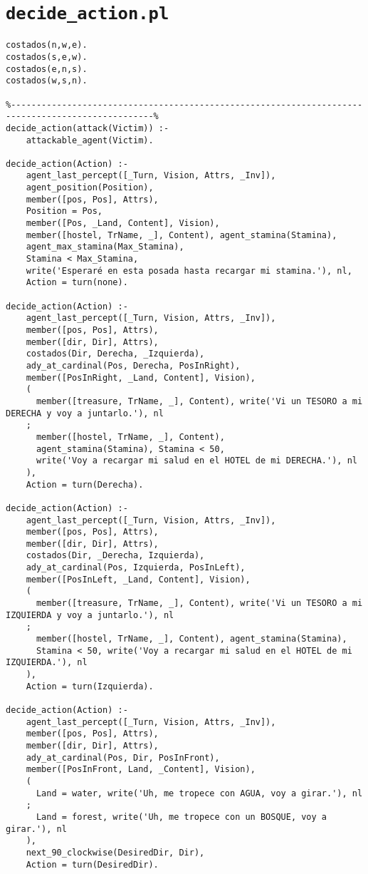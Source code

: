 \documentclass[a4paper,12pt]{report}
\begin{document}
\section{\texttt{decide\_action.pl}}

\begin{scriptsize}
\begin{verbatim}
costados(n,w,e).
costados(s,e,w).
costados(e,n,s).
costados(w,s,n).

%--------------------------------------------------------------------------------------------------%
decide_action(attack(Victim)) :-
    attackable_agent(Victim).

decide_action(Action) :-
    agent_last_percept([_Turn, Vision, Attrs, _Inv]),
    agent_position(Position),
    member([pos, Pos], Attrs),
    Position = Pos,
    member([Pos, _Land, Content], Vision),
    member([hostel, TrName, _], Content), agent_stamina(Stamina), 
    agent_max_stamina(Max_Stamina),
    Stamina < Max_Stamina,
    write('Esperaré en esta posada hasta recargar mi stamina.'), nl,
    Action = turn(none).

decide_action(Action) :-
    agent_last_percept([_Turn, Vision, Attrs, _Inv]),
    member([pos, Pos], Attrs),
    member([dir, Dir], Attrs),
    costados(Dir, Derecha, _Izquierda),
    ady_at_cardinal(Pos, Derecha, PosInRight),
    member([PosInRight, _Land, Content], Vision),
    (
      member([treasure, TrName, _], Content), write('Vi un TESORO a mi DERECHA y voy a juntarlo.'), nl
    ;
      member([hostel, TrName, _], Content), 
      agent_stamina(Stamina), Stamina < 50, 
      write('Voy a recargar mi salud en el HOTEL de mi DERECHA.'), nl
    ),
    Action = turn(Derecha).

decide_action(Action) :-
    agent_last_percept([_Turn, Vision, Attrs, _Inv]),
    member([pos, Pos], Attrs),
    member([dir, Dir], Attrs),
    costados(Dir, _Derecha, Izquierda),
    ady_at_cardinal(Pos, Izquierda, PosInLeft),
    member([PosInLeft, _Land, Content], Vision),
    (
      member([treasure, TrName, _], Content), write('Vi un TESORO a mi IZQUIERDA y voy a juntarlo.'), nl
    ;
      member([hostel, TrName, _], Content), agent_stamina(Stamina), 
      Stamina < 50, write('Voy a recargar mi salud en el HOTEL de mi IZQUIERDA.'), nl
    ),
    Action = turn(Izquierda).
    
decide_action(Action) :-
    agent_last_percept([_Turn, Vision, Attrs, _Inv]),
    member([pos, Pos], Attrs),
    member([dir, Dir], Attrs),
    ady_at_cardinal(Pos, Dir, PosInFront),
    member([PosInFront, Land, _Content], Vision),
    (
      Land = water, write('Uh, me tropece con AGUA, voy a girar.'), nl
    ;
      Land = forest, write('Uh, me tropece con un BOSQUE, voy a girar.'), nl
    ),
    next_90_clockwise(DesiredDir, Dir),
    Action = turn(DesiredDir).



\end{verbatim}
\end{scriptsize}
\end{document}
